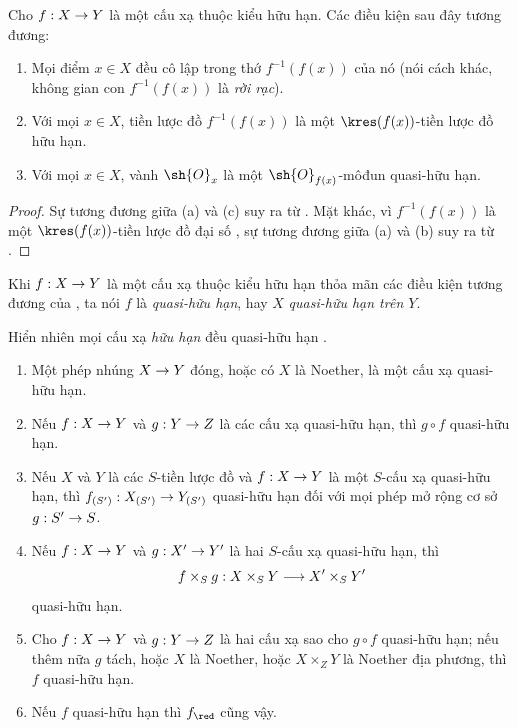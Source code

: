 \documentclass[oneside,10pt]{amsart}
\makeatletter
\newcommand{\ega@arrow}[2]{\mathchoice{#1}{#2}{#2}{#2}}
\renewcommand{\to}{\ega@arrow{\longrightarrow}{\rightarrow}}
\let\EGAOriginalLabel\label
\renewcommand{\label}[1]{\phantomsection\EGAOriginalLabel{#1}}
\makeatother
\begin{document}
\begin{corollary}[6.2.2]
\label{II.6.2.2}
Cho $f:X\to Y$ là một cấu xạ thuộc kiểu hữu hạn.
Các điều kiện sau đây tương đương:
\begin{enumerate}
  \item[\rm{(a)}] Mọi điểm $x\in X$ đều cô lập trong thớ $f^{-1}(f(x))$ của nó (nói cách khác, không gian con $f^{-1}(f(x))$ là \emph{rời rạc}).
  \item[\rm{(b)}] Với mọi $x\in X$, tiền lược đồ $f^{-1}(f(x))$ là một $\kres(f(x))$-tiền lược đồ hữu hạn.
  \item[\rm{(c)}] Với mọi $x\in X$, vành $\sh{O}_x$ là một $\sh{O}_{f(x)}$-môđun quasi-hữu hạn.
\end{enumerate}
\end{corollary}

\begin{proof}
Sự tương đương giữa (a) và (c) suy ra từ .
Mặt khác, vì $f^{-1}(f(x))$ là một $\kres(f(x))$-tiền lược đồ đại số , sự tương đương giữa (a) và (b) suy ra từ .
\end{proof}

\begin{definition}[6.2.3]
\label{II.6.2.3}
Khi $f:X\to Y$ là một cấu xạ thuộc kiểu hữu hạn thỏa mãn các điều kiện tương đương của , ta nói $f$ là \emph{quasi-hữu hạn}, hay $X$ \emph{quasi-hữu hạn trên $Y$}.
\end{definition}

Hiển nhiên mọi cấu xạ \emph{hữu hạn} đều quasi-hữu hạn .

\begin{proposition}[6.2.4]
\label{II.6.2.4}
\medskip\noindent
\begin{enumerate}
  \item[\rm{(i)}] Một phép nhúng $X\to Y$ đóng, hoặc có $X$ là Noether, là một cấu xạ quasi-hữu hạn.
  \item[\rm{(ii)}] Nếu $f:X\to Y$ và $g:Y\to Z$ là các cấu xạ quasi-hữu hạn, thì $g\circ f$ quasi-hữu hạn.
  \item[\rm{(iii)}] Nếu $X$ và $Y$ là các $S$-tiền lược đồ và $f:X\to Y$ là một $S$-cấu xạ quasi-hữu hạn, thì $f_{(S')}:X_{(S')}\to Y_{(S')}$ quasi-hữu hạn đối với mọi phép mở rộng cơ sở $g:S'\to S$.
  \item[\rm{(iv)}] Nếu $f:X\to Y$ và $g:X'\to Y'$ là hai $S$-cấu xạ quasi-hữu hạn, thì
    \[
      f\times_S g:X\times_S Y\to X'\times_S Y'
    \]
    quasi-hữu hạn.
  \item[\rm{(v)}] Cho $f:X\to Y$ và $g:Y\to Z$ là hai cấu xạ sao cho $g\circ f$ quasi-hữu hạn; nếu thêm nữa $g$ tách, hoặc $X$ là Noether, hoặc $X\times_ZY$ là Noether địa phương, thì $f$ quasi-hữu hạn.
  \item[\rm{(vi)}] Nếu $f$ quasi-hữu hạn thì $f_\red$ cũng vậy.
\end{enumerate}
\end{proposition}
\end{document}
